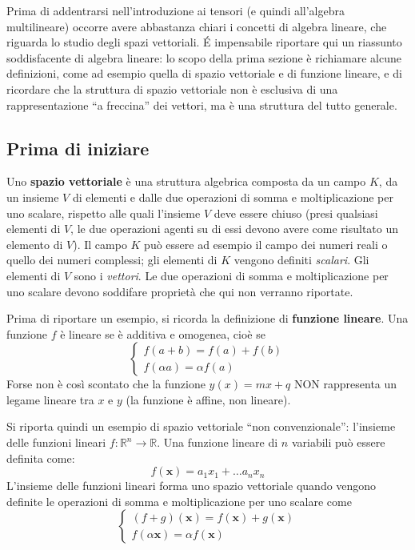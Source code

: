 Prima di addentrarsi nell'introduzione ai tensori (e quindi all'algebra multilineare) occorre 
 avere abbastanza chiari i concetti di algebra lineare, che riguarda lo studio degli spazi 
 vettoriali. \'E impensabile riportare qui un riassunto soddisfacente di algebra lineare: lo
 scopo della prima sezione è richiamare alcune definizioni, come ad esempio quella di spazio 
 vettoriale e di funzione lineare, e di ricordare che la struttura di spazio vettoriale non è
 esclusiva di una rappresentazione ``a freccina'' dei vettori, ma è una struttura del tutto generale.

\subsection{Prima di iniziare}

 Uno \textbf{spazio vettoriale} è una struttura algebrica composta da un campo $K$, da un insieme $V$
 di elementi e dalle due operazioni di somma e moltiplicazione per uno scalare, rispetto alle quali l'insieme
 $V$ deve essere chiuso (presi qualsiasi elementi di $V$, le due operazioni agenti su di essi devono avere
 come risultato un elemento di $V$). Il campo $K$ può essere ad esempio il campo dei numeri reali o quello dei
 numeri complessi; gli elementi di $K$ vengono definiti \textit{scalari}. Gli elementi di $V$ sono i \textit{vettori}.
 Le due operazioni di somma e moltiplicazione per uno scalare devono soddifare proprietà che qui non verranno
 riportate.
 
 Prima di riportare un esempio, si ricorda la definizione di \textbf{funzione lineare}. Una funzione $f$ è lineare se
 è additiva e omogenea, cioè se
 \begin{equation}
  \begin{cases}
   f(a+b) = f(a) + f(b) \\
   f(\alpha a) = \alpha f(a)
  \end{cases}
 \end{equation}
 Forse non è così scontato che la funzione $y(x) = m x + q$ NON rappresenta un legame lineare tra $x$ e $y$ (la funzione
 è affine, non lineare).
 
 Si riporta quindi un esempio di spazio vettoriale ``non convenzionale'': l'insieme delle funzioni lineari $f: \mathbb{R}^n \rightarrow
  \mathbb{R}$. Una funzione lineare di $n$ variabili può essere definita come:
  \begin{equation}
   f(\bm{x}) = a_1 x_1 + \dots a_n x_n
  \end{equation}
  L'insieme delle funzioni lineari forma uno spazio vettoriale quando vengono definite le operazioni
  di somma e moltiplicazione per uno scalare come
 \begin{equation}
  \begin{cases}
   (f+g)(\bm{x})    = f(\bm{x}) + g(\bm{x}) \\
   f(\alpha \bm{x}) = \alpha f(\bm{x})
  \end{cases}
 \end{equation}
 
